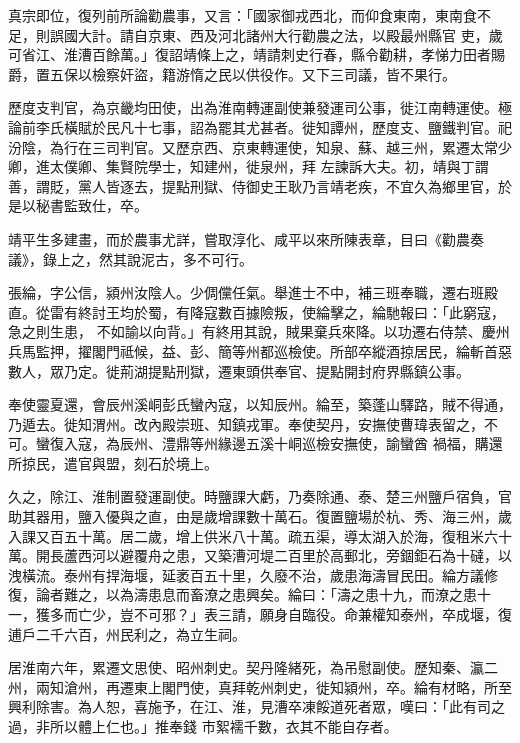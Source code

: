 \begin{pinyinscope}
 真宗即位，復列前所論勸農事，又言：「國家御戎西北，而仰食東南，東南食不足，則誤國大計。請自京東、西及河北諸州大行勸農之法，以殿最州縣官
 吏，歲可省江、淮漕百餘萬。」復詔靖條上之，靖請刺史行春，縣令勸耕，孝悌力田者賜爵，置五保以檢察奸盜，籍游惰之民以供役作。又下三司議，皆不果行。



 歷度支判官，為京畿均田使，出為淮南轉運副使兼發運司公事，徙江南轉運使。極論前李氏橫賦於民凡十七事，詔為罷其尤甚者。徙知譚州，歷度支、鹽鐵判官。祀汾陰，為行在三司判官。又歷京西、京東轉運使，知泉、蘇、越三州，累遷太常少卿，進太僕卿、集賢院學士，知建州，徙泉州，拜
 左諫訴大夫。初，靖與丁謂善，謂貶，黨人皆逐去，提點刑獄、侍御史王耿乃言靖老疾，不宜久為鄉里官，於是以秘書監致仕，卒。



 靖平生多建畫，而於農事尤詳，嘗取淳化、咸平以來所陳表章，目曰《勸農奏議》，錄上之，然其說泥古，多不可行。



 張綸，字公信，潁州汝陰人。少倜儻任氣。舉進士不中，補三班奉職，遷右班殿直。從雷有終討王均於蜀，有降寇數百據險叛，使綸擊之，綸馳報曰：「此窮寇，急之則生患，
 不如諭以向背。」有終用其說，賊果棄兵來降。以功遷右侍禁、慶州兵馬監押，擢閣門祗候，益、彭、簡等州都巡檢使。所部卒縱酒掠居民，綸斬首惡數人，眾乃定。徙荊湖提點刑獄，遷東頭供奉官、提點開封府界縣鎮公事。



 奉使靈夏還，會辰州溪峒彭氏蠻內寇，以知辰州。綸至，築蓬山驛路，賊不得通，乃遁去。徙知渭州。改內殿崇班、知鎮戎軍。奉使契丹，安撫使曹瑋表留之，不可。蠻復入寇，為辰州、澧鼎等州緣邊五溪十峒巡檢安撫使，諭蠻酋
 禍福，購還所掠民，遣官與盟，刻石於境上。



 久之，除江、淮制置發運副使。時鹽課大虧，乃奏除通、泰、楚三州鹽戶宿負，官助其器用，鹽入優與之直，由是歲增課數十萬石。復置鹽場於杭、秀、海三州，歲入課又百五十萬。居二歲，增上供米八十萬。疏五渠，導太湖入於海，復租米六十萬。開長蘆西河以避覆舟之患，又築漕河堤二百里於高郵北，旁錮鉅石為十䃮，以洩橫流。泰州有捍海堰，延袤百五十里，久廢不治，歲患海濤冒民田。綸方議修
 復，論者難之，以為濤患息而畜潦之患興矣。綸曰：「濤之患十九，而潦之患十一，獲多而亡少，豈不可邪？」表三請，願身自臨役。命兼權知泰州，卒成堰，復逋戶二千六百，州民利之，為立生祠。



 居淮南六年，累遷文思使、昭州刺史。契丹隆緒死，為吊慰副使。歷知秦、瀛二州，兩知滄州，再遷東上閣門使，真拜乾州刺史，徙知潁州，卒。綸有材略，所至興利除害。為人恕，喜施予，在江、淮，見漕卒凍餒道死者眾，嘆曰：「此有司之過，非所以體上仁也。」推奉錢
 市絮襦千數，衣其不能自存者。




\end{pinyinscope}
